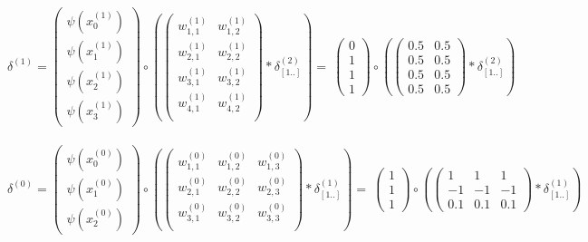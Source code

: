 \documentclass[12pt]{article}
\begin{document}
\indent $\delta^{(1)} = 
\begin{pmatrix}
\psi(x^{(1)}_0) \\ \psi(x^{(1)}_1) \\ \psi(x^{(1)}_2) \\ \psi(x^{(1)}_3)
\end{pmatrix} \circ \left(
\begin{pmatrix}
w_{1,1}^{(1)} & w_{1,2}^{(1)}\\
w_{2,1}^{(1)} & w_{2,2}^{(1)}\\
w_{3,1}^{(1)} & w_{3,2}^{(1)}\\
w_{4,1}^{(1)} & w_{4,2}^{(1)}\\
\end{pmatrix}
* \delta_{[1..]}^{(2)} \right) =
\
\begin{pmatrix}
0 \\ 1 \\ 1 \\ 1
\end{pmatrix} \circ \left(
\begin{pmatrix}
0.5 & 0.5\\
0.5 & 0.5\\
0.5 & 0.5\\
0.5 & 0.5
\end{pmatrix}
* \delta_{[1..]}^{(2)} \right)
$\\\\


\indent $\delta^{(0)} = 
\begin{pmatrix}
\psi(x^{(0)}_0) \\ \psi(x^{(0)}_1) \\ \psi(x^{(0)}_2)
\end{pmatrix} \circ \left(
\begin{pmatrix}
w_{1,1}^{(0)} & w_{1,2}^{(0)} & w_{1,3}^{(0)}\\
w_{2,1}^{(0)} & w_{2,2}^{(0)} & w_{2,3}^{(0)}\\
w_{3,1}^{(0)} & w_{3,2}^{(0)} & w_{3,3}^{(0)}\\
\end{pmatrix}
* \delta_{[1..]}^{(1)} \right) =
\
\begin{pmatrix}
1 \\ 1 \\ 1 
\end{pmatrix} \circ \left(
\begin{pmatrix}
1 & 1 & 1\\
-1 & -1 & -1\\
0.1 & 0.1 & 0.1
\end{pmatrix}
* \delta_{[1..]}^{(1)} \right)
$\\
\end{document}
